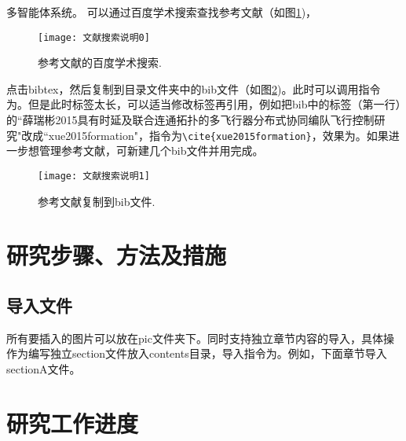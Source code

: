 \documentclass[bachelor_p]{hdu-report}
\begin{document}
多智能体系统\citep{cao2011formation}。
可以通过百度学术搜索查找参考文献（如图\ref{fig_search0})，
 \begin{figure}[!htb]
  \centering
  \texttt{[image: 文献搜索说明0]}
  \caption{参考文献的百度学术搜索.}
  \label{fig_search0}
\end{figure}
点击bibtex，然后复制到目录文件夹中的bib文件（如图\ref{fig_search1})。此时可以调用指令为\citep{薛瑞彬2015具有时延及联合连通拓扑的多飞行器分布式协同编队飞行控制研究}。但是此时标签太长，可以适当修改标签再引用，例如把bib中的标签（第一行）的``薛瑞彬2015具有时延及联合连通拓扑的多飞行器分布式协同编队飞行控制研究"改成``xue2015formation"，指令为\verb+\cite{xue2015formation}+，效果为\cite{xue2015formation}。如果进一步想管理参考文献，可新建几个bib文件并用\verb++完成。
 \begin{figure}[!htb]
  \centering
  \texttt{[image: 文献搜索说明1]}
  \caption{参考文献复制到bib文件.}
  \label{fig_search1}
\end{figure}






\section{研究步骤、方法及措施}
\subsection{导入文件}
所有要插入的图片可以放在pic文件夹下。同时支持独立章节内容的导入，具体操作为编写独立section文件放入contents目录，导入指令为\verb++。例如，下面章节导入sectionA文件。





\section{研究工作进度}
\end{document}
